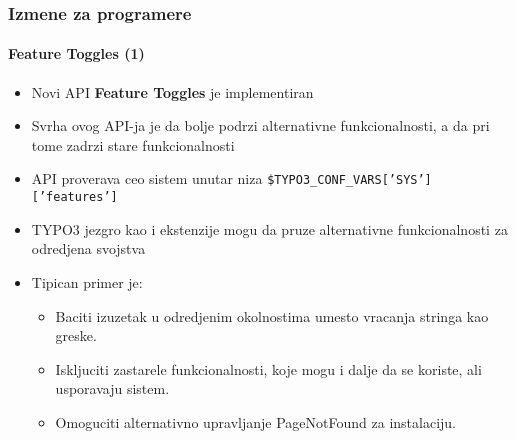 
\begin{frame}[fragile]
	\frametitle{Izmene za programere}
	\framesubtitle{Feature Toggles (1)}

	\begin{itemize}
		\item Novi API \textbf{Feature Toggles} je implementiran
		\item Svrha ovog API-ja je da bolje podrzi alternativne funkcionalnosti,
			a da pri tome zadrzi stare funkcionalnosti
		\item API proverava ceo sistem unutar niza\newline
			\small
				\texttt{\$TYPO3\_CONF\_VARS['SYS']['features']}
			\normalsize
		\item TYPO3 jezgro kao i ekstenzije mogu da pruze alternativne funkcionalnosti za
			odredjena svojstva
		\item Tipican primer je:
			\smaller
			\begin{itemize}
				\item Baciti izuzetak u odredjenim okolnostima umesto vracanja
					stringa kao greske.
				\item Iskljuciti zastarele funkcionalnosti, koje mogu i dalje da se koriste,
					ali usporavaju sistem.
				\item Omoguciti alternativno upravljanje PageNotFound za instalaciju.
			\end{itemize}
			\normalsize

	\end{itemize}

\end{frame}


